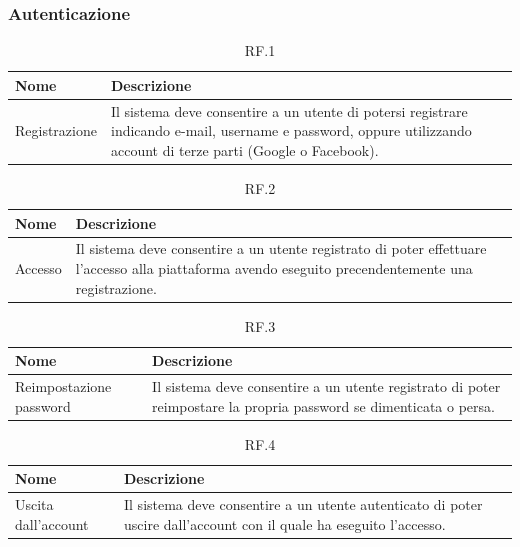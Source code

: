 \documentclass{natourDoc}
\begin{document}
\subsubsection{Autenticazione}
\begin{table}[H]
	\centering
	\begin{tabular}{ |p{5cm}|p{10.3cm}| }
		\hline
		\rowcolor{PineGreen!70}
		\textbf{Nome} & \textbf{Descrizione}                                                                                                                                      \\
		\hline
		Registrazione & Il sistema deve consentire a un utente di potersi registrare indicando e-mail, username e password, oppure utilizzando account di terze parti (Google o Facebook). \\
		\hline
	\end{tabular}
	\caption{RF.1}
\end{table}

\begin{table}[H]
	\centering
	\begin{tabular}{ |p{5cm}|p{10.3cm}| }
		\hline
		\rowcolor{PineGreen!70}
		\textbf{Nome} & \textbf{Descrizione}                                                                                                                       \\
		\hline
		Accesso       & Il sistema deve consentire a un utente registrato di poter effettuare l'accesso alla piattaforma avendo eseguito precendentemente una registrazione. \\
		\hline
	\end{tabular}
	\caption{RF.2}

\end{table}

\begin{table}[H]
	\centering
	\begin{tabular}{ |p{5cm}|p{10.3cm}| }
		\hline
		\rowcolor{PineGreen!70}
		\textbf{Nome}           & \textbf{Descrizione}                                                                                                \\
		\hline
		Reimpostazione password & Il sistema deve consentire a un utente registrato di poter reimpostare la propria password se dimenticata o persa. \\
		\hline
	\end{tabular}
	\caption{RF.3}

\end{table}

\begin{table}[H]
	\centering
	\begin{tabular}{ |p{5cm}|p{10.3cm}| }
		\hline
		\rowcolor{PineGreen!70}
		\textbf{Nome}       & \textbf{Descrizione}                                                                                               \\
		\hline
		Uscita dall'account & Il sistema deve consentire a un utente autenticato di poter uscire dall'account con il quale ha eseguito l'accesso. \\
		\hline
	\end{tabular}
	\caption{RF.4}

\end{table}
\end{document}
